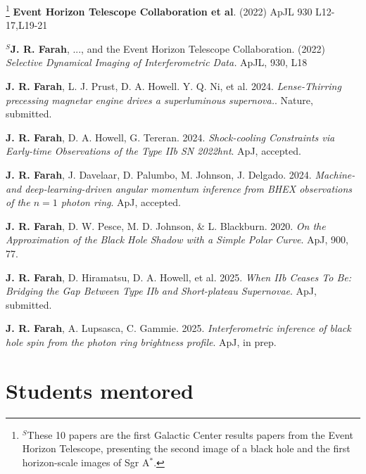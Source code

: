 \documentclass[margin,line]{res}
\begin{document}
\begin{resume}
\footnote[$^S$]{\noindent $^S$These 10  papers are the first Galactic Center results papers from the Event Horizon Telescope, presenting the second image of a black hole and the first horizon-scale images of Sgr A$^\ast$.}
\textbf{Event Horizon Telescope Collaboration et al}. (2022) ApJL 930 L12-17,L19-21

\textbf{$^S$J. R. Farah}, ..., and the Event Horizon Telescope Collaboration. (2022) \textit{Selective Dynamical Imaging of Interferometric Data.} ApJL, 930, L18

\textbf{J. R. Farah}, L. J. Prust, D. A. Howell. Y. Q. Ni, et al. 2024. \textit{Lense-Thirring precessing magnetar engine drives a superluminous supernova.}. Nature, submitted.


\textbf{J. R. Farah}, D. A. Howell, G. Tereran. 2024. \textit{Shock-cooling Constraints via Early-time Observations of the Type IIb SN 2022hnt}. ApJ, accepted.


\textbf{J. R. Farah}, J. Davelaar, D. Palumbo, M. Johnson, J. Delgado. 2024. \textit{Machine- and deep-learning-driven angular momentum inference from BHEX observations of the $n = 1$ photon ring}. ApJ, accepted.

\textbf{J. R. Farah}, D. W. Pesce, M. D. Johnson, \& L. Blackburn. 2020. \textit{On the Approximation of the Black Hole Shadow with a Simple Polar Curve}. ApJ, 900, 77.


\textbf{J. R. Farah}, D. Hiramatsu, D. A. Howell, et al. 2025. \textit{When IIb Ceases To Be: Bridging the Gap Between Type IIb and Short-plateau Supernovae}. ApJ, submitted.


\textbf{J. R. Farah}, A. Lupsasca, C. Gammie. 2025. \textit{Interferometric inference of black hole spin from the photon ring brightness profile}. ApJ, in prep.






\vspace{+.4cm}
\section{\sc Students mentored}


\end{resume}
\end{document}
